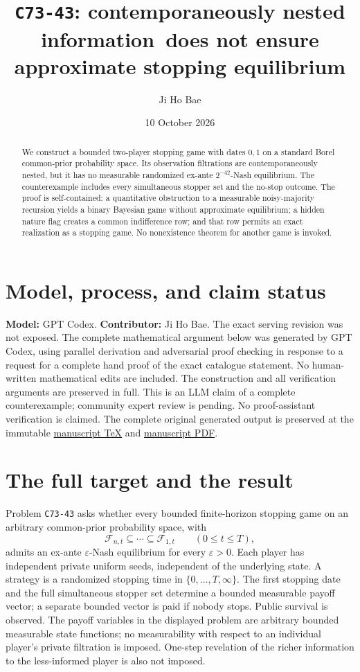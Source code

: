 \documentclass[11pt]{article}
\title{\texttt{C73-43}: contemporaneously nested information\ does not ensure approximate stopping equilibrium}
\author{Ji Ho Bae}
\date{10 October 2026}
\theoremstyle{remark}
\newcommand{\F}{\mathcal F}
\begin{document}
\maketitle
\section*{Model, process, and claim status}
\noindent\textbf{Model:} GPT Codex. \textbf{Contributor:} Ji Ho Bae.
The exact serving revision was not exposed.
The complete mathematical argument below was generated by GPT Codex,
using parallel derivation and adversarial proof checking in response to a
request for a complete hand proof of the exact catalogue statement.
No human-written mathematical edits are included. The construction and
all verification arguments are preserved in full.
This is an LLM claim of a complete counterexample; community expert review
is pending. No proof-assistant verification is claimed.
The complete original generated output is preserved at the immutable
\href{https://github.com/jbaelaw/nested-stopping-no-approximate-equilibrium/blob/6db16ed056d8f0f464dff4fcca8da2fddf3efd36/paper/Proof.tex}{manuscript TeX}
and \href{https://github.com/jbaelaw/nested-stopping-no-approximate-equilibrium/blob/6db16ed056d8f0f464dff4fcca8da2fddf3efd36/paper/Proof.pdf}{manuscript PDF}.


\begin{abstract}
We construct a bounded two-player stopping game with dates $0,1$ on a
standard Borel common-prior probability space. Its observation filtrations
are contemporaneously nested, but it has no measurable randomized ex-ante
$2^{-42}$-Nash equilibrium. The counterexample includes every simultaneous
stopper set and the no-stop outcome. The proof is self-contained: a
quantitative obstruction to a measurable noisy-majority recursion yields
a binary Bayesian game without approximate equilibrium; a hidden nature
flag creates a common indifference row; and that row permits an exact
realization as a stopping game. No nonexistence theorem for another game
is invoked.
\end{abstract}

\section{The full target and the result}

Problem \texttt{C73-43} asks whether every bounded finite-horizon stopping
game on an arbitrary common-prior probability space, with
\[
 \F_{n,t}\subseteq\cdots\subseteq\F_{1,t}\qquad(0\le t\le T),
\]
admits an ex-ante $\varepsilon$-Nash equilibrium for every
$\varepsilon>0$. Each player has independent private uniform seeds,
independent of the underlying state. A strategy is a randomized stopping
time in $\{0,\ldots,T,\infty\}$. The first stopping date and the full
simultaneous stopper set determine a bounded measurable payoff vector;
a separate bounded vector is paid if nobody stops. Public survival is
observed. The payoff variables in the displayed problem are arbitrary
bounded measurable state functions; no measurability with respect to an
individual player's private filtration is imposed. One-step revelation
of the richer information to the less-informed player is also not
imposed.
\end{document}
